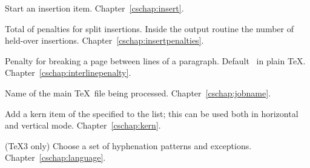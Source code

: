 \begin{glossinventory}
\item [\cs{insert\gr{8-bit number}\lb\gr{vertical mode material}\rb}]
      Start an insertion item.
Chapter~\ref{cschap:insert}.

\item [\cs{insertpenalties}]
      Total of penalties for split insertions.
      Inside the output routine the number of held-over insertions.
Chapter~\ref{cschap:insertpenalties}.

\item [\cs{interlinepenalty}]
      Penalty for breaking a page between lines of a paragraph. 
      Default~ in plain \TeX.
Chapter~\ref{cschap:interlinepenalty}.

\item [\cs{jobname}]
      Name of the main \TeX\ file being processed.
Chapter~\ref{cschap:jobname}.

\item [\cs{kern\gr{dimen}}]
      Add a kern item of the specified
       to the list;
      this can be used both in horizontal and vertical mode.
Chapter~\ref{cschap:kern}.

\item [\cs{language}]
      (\TeX3 only)
      Choose a set of hyphenation patterns and exceptions.
Chapter~\ref{cschap:language}.


\end{glossinventory}

